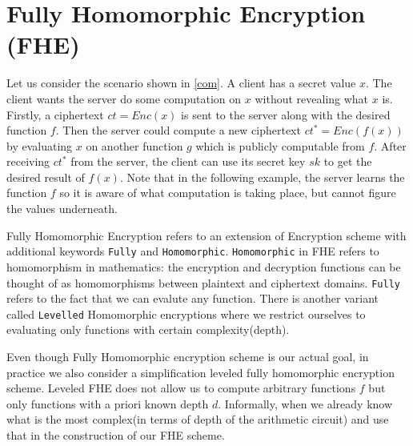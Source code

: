 \documentclass[usletter]{article}
\begin{document}
\section{Fully Homomorphic Encryption (FHE)}

Let us consider the scenario shown in \ref{com}. A client has a secret value $x$. The client wants the server do some computation on $x$ without revealing what $x$ is. Firstly, a ciphertext $ct=Enc(x)$ is sent to the server along with the desired function $f$. Then the server could compute a new ciphertext $ct^*=Enc(f(x))$ by evaluating $x$ on another function $g$ which is publicly computable from $f$. After receiving $ct^*$ from the server, the client can use its secret key $sk$ to get the desired result of $f(x)$. Note that in the following example, the server learns the function $f$ so it is aware of what computation is taking place, but cannot figure the values underneath. 

Fully Homomorphic Encryption refers to an extension of Encryption scheme with additional keywords \texttt{Fully} and \texttt{Homomorphic}.
\texttt{Homomorphic} in FHE refers to homomorphism in mathematics: the encryption and decryption functions can be thought of as homomorphisms between plaintext and ciphertext domains. \texttt{Fully} refers to the fact that we can evalute any function. There is another variant called \texttt{Levelled} Homomorphic encryptions where we restrict ourselves to evaluating only functions with certain complexity(depth). 

Even though Fully Homomorphic encryption scheme is our actual goal, in practice we also consider a simplification leveled fully homomorphic encryption scheme. Leveled FHE does not allow us to compute arbitrary functions $f$ but only functions with a priori known depth $d$. Informally, when we already know what is the most complex(in terms of depth of the arithmetic circuit) and use that in the construction of our FHE scheme.
\end{document}
